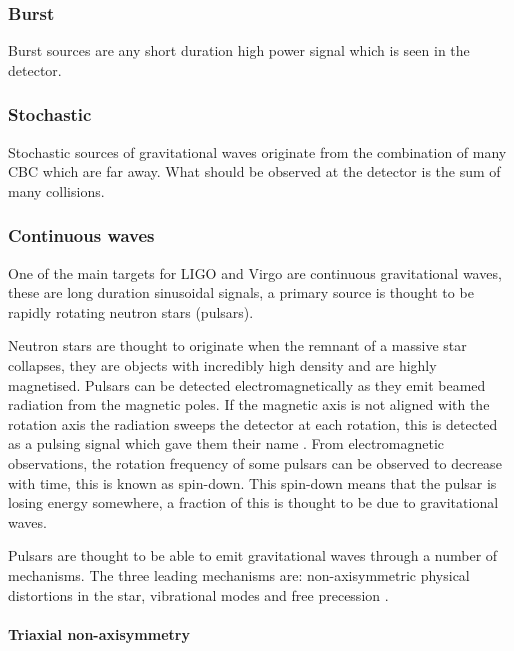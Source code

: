 \subsubsection{Burst}

Burst sources are any short duration high power signal which is seen in the detector. 

\subsubsection{Stochastic}

Stochastic sources of gravitational waves originate from the combination of many \ac{CBC} which are far away. What should be observed at the detector is the sum of many collisions. 

\subsubsection{Continuous waves}


One of the main targets for \ac{LIGO} and Virgo are continuous gravitational waves, these are long duration sinusoidal signals, a primary source is thought to be rapidly rotating neutron stars (pulsars). 

Neutron stars are thought to originate when the remnant of a massive star collapses, they are objects with incredibly high density and are highly magnetised.
Pulsars can be detected electromagnetically as they emit beamed radiation from the magnetic poles.
If the magnetic axis is not aligned with the rotation axis the radiation sweeps the detector at each rotation, this is detected as a pulsing signal which gave them their name \cite{lyne_graham-smith_2012}.
From electromagnetic observations, the rotation frequency of some pulsars can be observed to decrease with time, this is known as spin-down.
This spin-down means that the pulsar is losing energy somewhere, a fraction of this is thought to be due to gravitational waves. 

Pulsars are thought to be able to emit gravitational waves through a number of mechanisms. The three leading mechanisms are: non-axisymmetric physical distortions in the star, vibrational modes and free precession \cite{Becker2009}.

\paragraph{Triaxial non-axisymmetry}

